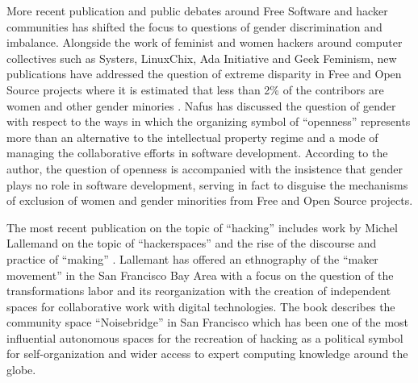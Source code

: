 \documentclass[10pt,letter,oneside]{scrartcl}
\begin{document}
More recent publication and public debates around Free Software and hacker
communities has shifted the focus to questions of gender discrimination and
imbalance.  Alongside the work of feminist and women hackers around computer
collectives such as Systers, LinuxChix, Ada Initiative and Geek Feminism, new
publications have addressed the question of extreme disparity in Free and Open
Source projects where it is estimated that less than 2\% of the contribors are
women and other gender minories \parencite{ghosh_understanding_2005}.  Nafus
\cite*{nafus_patches_2012} has discussed the question of gender with respect to
the ways in which the organizing symbol of ``openness'' represents more than an
alternative to the intellectual property regime and a mode of managing the
collaborative efforts in software development.  According to the author, the
question of openness is accompanied with the insistence that gender plays no
role in software development, serving in fact to disguise the mechanisms of
exclusion of women and gender minorities from Free and Open Source projects.


The most recent publication on the topic of ``hacking'' includes work by Michel
Lallemand on the topic of ``hackerspaces'' and the rise of the discourse and
practice of ``making'' \parencite{lallement}.  Lallemant has offered an ethnography
of the ``maker movement'' in the San Francisco Bay Area with a focus on the
question of the transformations labor and its reorganization with the creation
of independent spaces for collaborative work with digital technologies. The book
describes the community space ``Noisebridge'' in San Francisco which has been
one of the most influential autonomous spaces for the recreation of hacking as a
political symbol for self-organization and wider access to expert computing 
knowledge around the globe.
\end{document}
